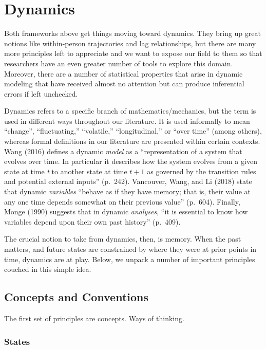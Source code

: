 \documentclass[english,,man]{apa6}
\theoremstyle{definition}
\theoremstyle{definition}
\theoremstyle{definition}
\theoremstyle{remark}
\begin{document}
\hypertarget{dynamics}{%
\section{Dynamics}\label{dynamics}}

Both frameworks above get things moving toward dynamics. They bring up
great notions like within-person trajectories and lag relationships, but
there are many more principles left to appreciate and we want to expose
our field to them so that researchers have an even greater number of
tools to explore this domain. Moreover, there are a number of
statistical properties that arise in dynamic modeling that have received
almost no attention but can produce inferential errors if left
unchecked.

Dynamics refers to a specific branch of mathematics/mechanics, but the
term is used in different ways throughout our literature. It is used
informally to mean \enquote{change}, \enquote{fluctuating,}
\enquote{volatile,} \enquote{longitudinal,} or \enquote{over time}
(among others), whereas formal definitions in our literature are
presented within certain contexts. Wang (2016) defines a dynamic
\emph{model} as a \enquote{representation of a system that evolves over
time. In particular it describes how the system evolves from a given
state at time \emph{t} to another state at time \(t + 1\) as governed by
the transition rules and potential external inputs} (p.~242). Vancouver,
Wang, and Li (2018) state that dynamic \emph{variables} \enquote{behave
as if they have memory; that is, their value at any one time depends
somewhat on their previous value} (p.~604). Finally, Monge (1990)
suggests that in dynamic \emph{analyses}, \enquote{it is essential to
know how variables depend upon their own past history} (p.~409).

The crucial notion to take from dynamics, then, is memory. When the past
matters, and future states are constrained by where they were at prior
points in time, dynamics are at play. Below, we unpack a number of
important principles couched in this simple idea.

\hypertarget{concepts-and-conventions}{%
\subsection{Concepts and Conventions}\label{concepts-and-conventions}}

The first set of principles are concepts. Ways of thinking.

\hypertarget{states}{%
\subsubsection{States}\label{states}}
\end{document}
